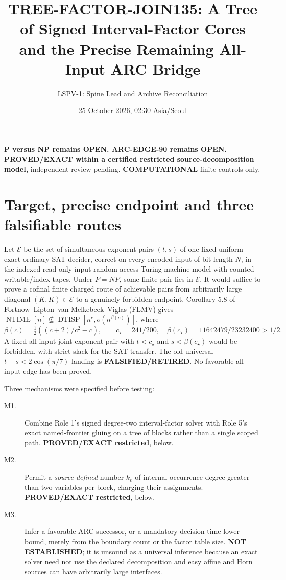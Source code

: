 \documentclass[11pt]{article}
\title{TREE-FACTOR-JOIN135: A Tree of Signed Interval-Factor Cores\\
and the Precise Remaining All-Input ARC Bridge}
\author{LSPV-1: Spine Lead and Archive Reconciliation}
\date{25 October 2026, 02:30 Asia/Seoul}
\begin{document}
\maketitle
\begin{center}
\textbf{P versus NP remains OPEN. ARC-EDGE-90 remains OPEN.}\\
\textbf{PROVED/EXACT within a certified restricted source-decomposition model,}
independent review pending. \textbf{COMPUTATIONAL} finite controls only.
\end{center}

\section{Target, precise endpoint and three falsifiable routes}
Let $\mathcal E$ be the set of simultaneous exponent pairs $(t,s)$ of one
fixed uniform exact ordinary-SAT decider, correct on every encoded input
of bit length $N$, in the indexed read-only-input random-access Turing
machine model with counted writable/index tapes. Under $P=NP$, some finite
pair lies in $\mathcal E$. It would suffice to prove a cofinal finite
charged route of achievable pairs from arbitrarily large diagonal
$(K,K)\in\mathcal E$ to a genuinely forbidden endpoint.
Corollary 5.8 of Fortnow--Lipton--van Melkebeek--Viglas (FLMV) gives
$\operatorname{NTIME}[n]\not\subseteq
\operatorname{DTISP}[n^c,o(n^{\beta(c)})]$, where
\[
\beta(c)=\tfrac12((c+2)/c^2-c),\qquad
c_\star=241/200,\quad
\beta(c_\star)=11642479/23232400>1/2.
\]
A fixed all-input joint exponent pair with $t<c_\star$ and
$s<\beta(c_\star)$ would be forbidden, with strict slack for the SAT
transfer. The old universal $t+s<2\cos(\pi/7)$ landing is
\textbf{FALSIFIED/RETIRED}. No favorable all-input edge has been proved.

Three mechanisms were specified before testing:
\begin{description}
\item[M1.] Combine Role 1's signed degree-two interval-factor solver with
Role 5's exact named-frontier gluing on a tree of blocks rather than a
single scoped path. \textbf{PROVED/EXACT restricted}, below.
\item[M2.] Permit a \emph{source-defined} number $k_v$ of internal
occurrence-degree-greater-than-two variables per block, charging their
assignments. \textbf{PROVED/EXACT restricted}, below.
\item[M3.] Infer a favorable ARC successor, or a mandatory decision-time
lower bound, merely from the boundary count or the factor table size.
\textbf{NOT ESTABLISHED}; it is unsound as a universal inference because
an exact solver need not use the declared decomposition and easy affine
and Horn sources can have arbitrarily large interfaces.
\end{description}
\end{document}
